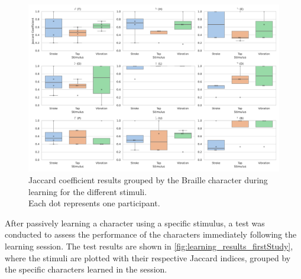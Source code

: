 \begin{table}[ht]
\centering
{}
\caption{Statistical Test Results for the direct comparison between the stimuli.\\\text{*} indicates results obtained via Negative Log-Likelihood under $H_0$.}
\label{table:statistical_tests_comparrisson_firstStudy}
\end{table}

\begin{figure}
    \centering
    \includegraphics[width=\linewidth]{src/pictures/Study1Data_Experiment/study1_learning_results.pdf}
    \caption{Jaccard coefficient results grouped by the Braille character during learning  for the different stimuli.\\Each dot represents one participant.}
    \label{fig:learning_results_firstStudy}
\end{figure}

After passively learning a character using a specific stimulus, a test was conducted to assess the performance of the characters immediately following the learning session. 
The test results are shown in \autoref{fig:learning_results_firstStudy}, where the stimuli are plotted with their respective Jaccard indices, grouped by the specific characters learned in the session.

